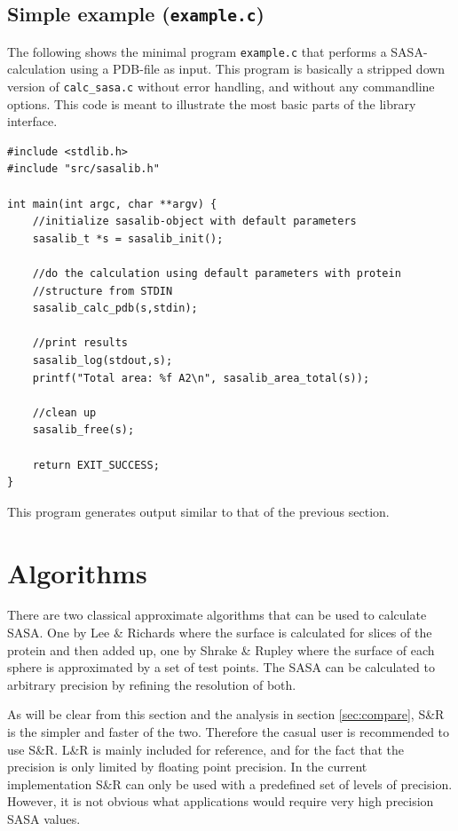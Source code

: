 \documentclass[a4paper,11pt]{article}
\begin{document}
\subsection{Simple example (\texttt{example.c})}\label{sec:simple_sample}

The following shows the minimal program \texttt{example.c} that
performs a SASA-calculation using a PDB-file as input. This program is
basically a stripped down version of \texttt{calc\_sasa.c} without
error handling, and without any commandline options. This code is
meant to illustrate the most basic parts of the library interface.
\begin{verbatim}
#include <stdlib.h>
#include "src/sasalib.h"

int main(int argc, char **argv) { 
    //initialize sasalib-object with default parameters
    sasalib_t *s = sasalib_init();

    //do the calculation using default parameters with protein
    //structure from STDIN
    sasalib_calc_pdb(s,stdin);

    //print results
    sasalib_log(stdout,s);
    printf("Total area: %f A2\n", sasalib_area_total(s));

    //clean up
    sasalib_free(s);

    return EXIT_SUCCESS;
}
\end{verbatim}
This program generates output similar to that of the previous
section.

\section{Algorithms}\label{sec:alg}

There are two classical approximate algorithms that can be used to
calculate SASA. One by Lee \& Richards \cite{LnR} where the surface is
calculated for slices of the protein and then added up, one by Shrake
\& Rupley \cite{SnR} where the surface of each sphere is approximated
by a set of test points. The SASA can be calculated to arbitrary
precision by refining the resolution of both.

As will be clear from this section and the analysis in section
\ref{sec:compare}, S\&R is the simpler and faster of the
two. Therefore the casual user is recommended to use S\&R. L\&R is
mainly included for reference, and for the fact that the precision is
only limited by floating point precision. In the current
implementation S\&R can only be used with a predefined set of levels
of precision. However, it is not obvious what applications would
require very high precision SASA values.
\end{document}
